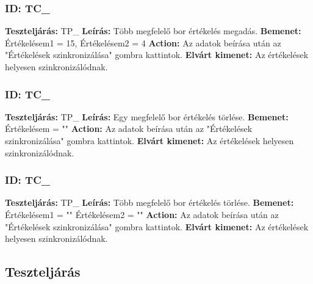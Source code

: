 \documentclass[12pt]{report}
\theoremstyle{definition}
\begin{document}
	\subsubsection{ID: TC\_}\addtocounter{TC}{1}
	\textbf{Teszteljárás:} TP\_
	\newline 
	\textbf{Leírás:} Több megfelelő bor értékelés megadás.
	\newline 
	\textbf{Bemenet:} Értékelésem1 = 15, Értékelésem2 = 4
	\newline 
	\textbf{Action:} Az adatok beírása után az "Értékelések szinkronizálása" gombra kattintok.
	\newline 
	\textbf{Elvárt kimenet:} Az értékelések helyesen szinkronizálódnak.
	
	\subsubsection{ID: TC\_}\addtocounter{TC}{1}
	\textbf{Teszteljárás:} TP\_
	\newline 
	\textbf{Leírás:} Egy megfelelő bor értékelés törlése.
	\newline 
	\textbf{Bemenet:} Értékelésem = ""
	\newline 
	\textbf{Action:} Az adatok beírása után az "Értékelések szinkronizálása" gombra kattintok.
	\newline 
	\textbf{Elvárt kimenet:} Az értékelések helyesen szinkronizálódnak.
	
	\subsubsection{ID: TC\_}\addtocounter{TC}{1}
	\textbf{Teszteljárás:} TP\_
	\newline 
	\textbf{Leírás:} Több megfelelő bor értékelés törlése.
	\newline 
	\textbf{Bemenet:} Értékelésem1 = "" Értékelésem2 = ""
	\newline 
	\textbf{Action:} Az adatok beírása után az "Értékelések szinkronizálása" gombra kattintok.
	\newline 
	\textbf{Elvárt kimenet:} Az értékelések helyesen szinkronizálódnak.
	
	
	\setcounter{TPTCStop}{\value{TC}}
	\subsection{Teszteljárás}
	
\end{document}
